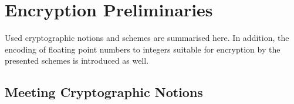 % 
%                                                                                                      
%                                                                                                      
%                                                                                                      
% 

\section{Encryption Preliminaries}\label{sec:prelims:crypto_prelims}
Used cryptographic notions and schemes are summarised here. In addition, the encoding of floating point numbers to integers suitable for encryption by the presented schemes is introduced as well.

% 
% 

\subsection{Meeting Cryptographic Notions}\label{subsec:prelims:crypto_notions}




% 
% 

